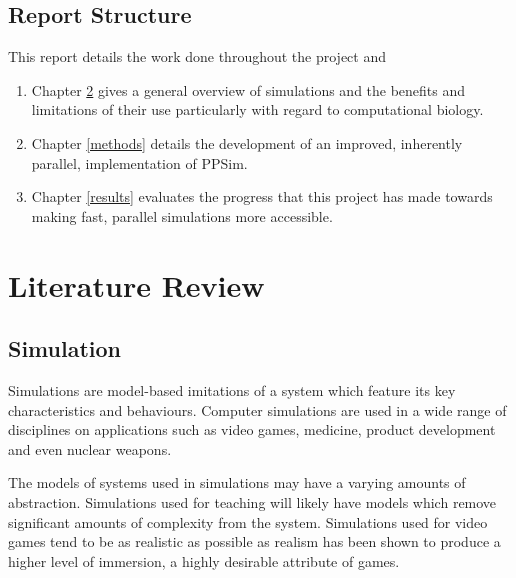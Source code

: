 \documentclass{UoYCSproject}
\begin{document}
\section{Report Structure}
This report details the work done throughout the project and 

\begin{enumerate}
	\item Chapter \ref{lit_review} gives a general overview of simulations and the benefits and limitations of their use particularly with regard to computational biology.
	\item Chapter \ref{methods} details the development of an improved, inherently parallel, implementation of PPSim.
	\item Chapter \ref{results} evaluates the progress that this project has made towards making fast, parallel simulations more accessible.
\end{enumerate}

\chapter{Literature Review}
\label{lit_review}
%

\section{Simulation}
\label{simulation}
Simulations are model-based imitations of a system which feature its key characteristics and behaviours. Computer simulations are used in a wide range of disciplines on applications such as video games, medicine, product development and even nuclear weapons.

The models of systems used in simulations may have a varying amounts of abstraction. Simulations used for teaching will likely have models which remove significant amounts of complexity from the system. Simulations used for video games tend to be as realistic as possible as realism has been shown to produce a higher level of immersion\cite{realism_immersion}, a highly desirable attribute of games.%
\end{document}
